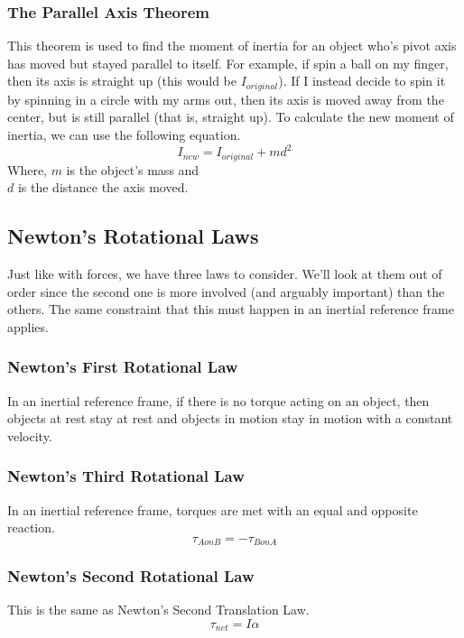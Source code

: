 \subsubsection{The Parallel Axis Theorem}
This theorem is used to find the moment of inertia for an object who's pivot axis has moved but stayed parallel to itself. For example, if spin a ball
on my finger, then its axis is straight up (this would be $I_{original}$). If I instead decide to spin it by spinning in a circle with my arms out, then 
its axis is moved away from the center, but is still parallel (that is, straight up). To calculate the new moment of inertia, we can use the following
equation.
\begin{equation}
    I_{new} = I_{original} + md^2
\end{equation}
Where,
$m$ is the object's mass and \\
$d$ is the distance the axis moved.

\subsection{Newton's Rotational Laws}
Just like with forces, we have three laws to consider. We'll look at them out of order since the second one is more involved (and arguably important)
than the others. The same constraint that this must happen in an inertial reference frame applies.

\subsubsection{Newton's First Rotational Law}
In an inertial reference frame, if there is no torque acting on an object, then objects at rest stay at rest and objects in motion stay in motion with 
a constant velocity.

\subsubsection{Newton's Third Rotational Law}
In an inertial reference frame, torques are met with an equal and opposite reaction.
\begin{equation}
    \tau_{A on B} = - \tau_{B on A}
\end{equation}

\subsubsection{Newton's Second Rotational Law}
This is the same as Newton's Second Translation Law.
\begin{equation}
    \tau_{net} = I \alpha
\end{equation}